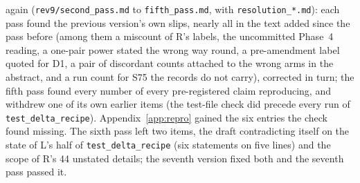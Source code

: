 \documentclass[11pt]{article}
\begin{document}
again (\texttt{rev9/second\_pass.md} to \texttt{fifth\_pass.md}, with \texttt{resolution\_*.md}): each pass found the previous version's own slips, nearly all in the text added since the pass before (among them a miscount of R's labels, the uncommitted Phase~4 reading, a one-pair power stated the wrong way round, a pre-amendment label quoted for D1, a pair of discordant counts attached to the wrong arms in the abstract, and a run count for S75 the records do not carry), corrected in turn; the fifth pass found every number of every pre-registered claim reproducing, and withdrew one of its own earlier items (the test-file check did precede every run of \texttt{test\_delta\_recipe}). Appendix~\ref{app:repro} gained the six entries the check found missing. The sixth pass left two items, the draft contradicting itself on the state of L's half of \texttt{test\_delta\_recipe} (six statements on five lines) and the scope of R's 44 unstated details; the seventh version fixed both and the seventh pass passed it.
\end{document}
